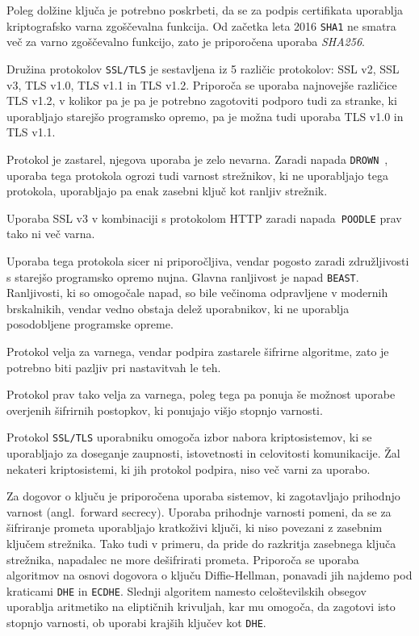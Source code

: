 \documentclass[12pt,a4paper,openany,tikz]{book}
\theoremstyle{plain}
\theoremstyle{definition}
\begin{document}
Poleg dolžine ključa je potrebno poskrbeti, da se za podpis certifikata uporablja kriptografsko varna zgoščevalna funkcija. Od začetka leta 2016 \texttt{SHA1} ne smatra več za varno zgoščevalno funkcijo, zato je priporočena uporaba \textit{SHA256}.

Družina protokolov \texttt{SSL/TLS} je sestavljena iz 5 različic protokolov: SSL v2, SSL v3, TLS v1.0, TLS v1.1 in TLS v1.2. Priporoča se uporaba najnovejše različice TLS v1.2, v kolikor pa je pa je potrebno zagotoviti podporo tudi za stranke, ki uporabljajo starejšo programsko opremo, pa je možna tudi uporaba TLS v1.0 in TLS v1.1.

\begin{mdframed}[frametitle=Pregled različic protokola SSL/TLS]
  \begin{description}[style=nextline]
    \item[SSL v2] Protokol je zastarel, njegova uporaba je zelo nevarna. Zaradi napada \texttt{DROWN}~\cite{aviramdrown}, uporaba tega protokola ogrozi tudi varnost strežnikov, ki ne uporabljajo tega protokola, uporabljajo pa enak zasebni ključ kot ranljiv strežnik.
    \item[SSL v3] Uporaba SSL v3 v kombinaciji s protokolom HTTP zaradi napada\ \texttt{POODLE} \cite{moller2014poodle} prav tako ni več varna.
    \item[TLS v1.0] Uporaba tega protokola sicer ni priporočljiva, vendar pogosto zaradi združljivosti s starejšo programsko opremo nujna. Glavna ranljivost je napad \texttt{BEAST}. Ranljivosti, ki so omogočale napad, so bile večinoma odpravljene v modernih brskalnikih, vendar vedno obstaja delež uporabnikov, ki ne uporablja posodobljene programske opreme.
    \item[TLS v1.1] Protokol velja za varnega, vendar podpira zastarele šifrirne algoritme, zato je potrebno biti pazljiv pri nastavitvah le teh.
    \item[TLS v1.2] Protokol prav tako velja za varnega, poleg tega pa ponuja še možnost uporabe overjenih šifrirnih postopkov, ki ponujajo višjo stopnjo varnosti.
  \end{description}
\end{mdframed}


Protokol \texttt{SSL/TLS} uporabniku omogoča izbor nabora kriptosistemov, ki se uporabljajo za doseganje zaupnosti, istovetnosti in celovitosti komunikacije. Žal nekateri kriptosistemi, ki jih protokol podpira, niso več varni za uporabo.

Za dogovor o ključu je priporočena uporaba sistemov, ki zagotavljajo prihodnjo varnost (angl.\ forward secrecy). Uporaba prihodnje varnosti pomeni, da se za šifriranje prometa uporabljajo kratkoživi ključi, ki niso povezani z zasebnim ključem strežnika. Tako tudi v primeru, da pride do razkritja zasebnega ključa strežnika, napadalec ne more dešifrirati prometa. Priporoča se uporaba algoritmov na osnovi dogovora o ključu Diffie-Hellman, ponavadi jih najdemo pod kraticami \texttt{DHE} in \texttt{ECDHE}. Slednji algoritem namesto celoštevilskih obsegov uporablja aritmetiko na eliptičnih krivuljah, kar mu omogoča, da zagotovi isto stopnjo varnosti, ob uporabi krajših ključev kot \texttt{DHE}.
\end{document}
